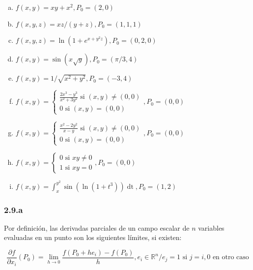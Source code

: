 \documentclass{article}
\renewcommand{\Bbb}{\mathbb}
\begin{document}
\begin{enumerate}[(a)]
\bfseries

\item $f(x,y) = xy + x^2, P_0 = (2, 0)$

\item $f(x,y,z) = xz / (y+z), P_0 = (1, 1, 1)$

\item $f(x, y, z) = \ln(1 + e^{x+y^2 z}), P_0 = (0, 2, 0)$

\item $f(x,y) = \sin(x \sqrt{y}), P_0 = (\pi/3, 4)$

\item $f(x,y) = 1/\sqrt{x^2 + y^2}, P_0 = (-3, 4)$

\item $f(x,y) = \left\{ \begin{array}{ll}
\frac{2x^3 - y^3}{x^2 + 3y^2} \text{ si } (x,y) \neq (0,0) \\
0 \text{ si } (x,y) = (0,0)
\end{array} \right., P_0 = (0,0)$

\item $f(x,y) = \left\{ \begin{array}{ll}
\frac{x^2 - 2y^2}{x - y} \text{ si } (x,y) \neq (0,0) \\
0 \text{ si } (x,y) = (0,0)
\end{array} \right., P_0 = (0,0)$ 

\item $f(x,y) = \left\{ \begin{array}{ll}
0 \text{ si } xy \neq 0 \\
1 \text{ si } xy = 0
\end{array} \right., P_0 = (0,0)$

\item $f(x,y) = \int_{x}^{y^2} \sin(\ln(1 + t^3)) \mathop{dt}, P_0 = (1,2)$

\end{enumerate}

\subsubsection*{2.9.a}
\label{subsubsec:2.9.a}

Por definición, las derivadas parciales de un campo escalar de $n$ variables evaluadas en un punto son los siguientes límites, si existen:

\begin{equation}
\frac{\partial f}{\partial x_i}(P_0) = \lim_{h \rightarrow 0} \frac{f(P_0 + h e_i) - f(P_0)}{h}, e_i \in \Bbb R^n / e_j = 1 \text{ si } j = i, 0 \text{ en otro caso} 
\end{equation}
\end{document}
